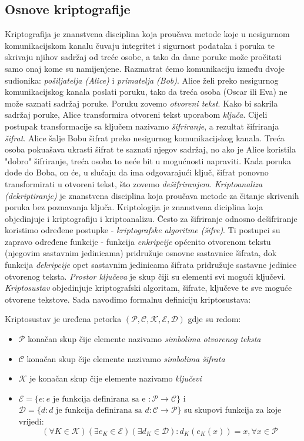 \documentclass[a4paper,oneside,12pt]{memoir} %
\begin{document}
\begin{spacing}{1.5}
\section{Osnove kriptografije}
\label{sec:kripto}
Kriptografija je znanstvena disciplina koja proučava metode koje u nesigurnom komunikacijskom kanalu  čuvaju integritet i sigurnost podataka i poruka te skrivaju njihov sadržaj od treće osobe, a tako da dane poruke može pročitati samo onaj kome su namijenjene. Razmatrat ćemo komunikaciju između dvoje sudionika: \textit{pošiljatelja (Alice)} i \textit{primatelja (Bob)}. Alice želi preko nesigurnog komunikacijskog kanala poslati poruku, tako da  treća osoba (Oscar ili Eva) ne može saznati sadržaj poruke. Poruku zovemo \textit{otvoreni tekst}. Kako bi sakrila sadržaj poruke, Alice transformira otvoreni tekst uporabom \textit{ključa}. Cijeli postupak transformacije sa ključem nazivamo \textit{šifriranje}, a rezultat šifriranja \textit{šifrat}. Alice šalje Bobu šifrat preko nesigurnog komunikacijskog kanala. Treća osoba pokuašava ukrasti šifrat te saznati njegov sadržaj, no ako je Alice koristila "dobro" šifriranje, treća osoba to neće bit u mogućnosti napraviti. Kada poruka dođe do Boba, on će, u slučaju da ima odgovarajući ključ, šifrat ponovno transformirati u otvoreni tekst, što zovemo \textit{dešifriranjem}. \textit{Kriptoanaliza (dekriptiranje)} je znanstvena disciplina koja proučava metode za čitanje skrivenih poruka bez poznavanja ključa. Kriptologija je znanstvena diciplina koja objedinjuje i kriptografiju i kriptoanalizu. Često za šifriranje odnosno dešifriranje koristimo određene postupke - \textit{kriptografske algoritme (šifre)}. Ti postupci su zapravo određene funkcije - funkcija \textit{enkripcije} općenito otvorenom tekstu (njegovim sastavnim jedinicama) pridružuje osnovne sastavnice šifrata, dok funkcija \textit{dekripcije} opet sastavnim jedinicama šifrata pridružuje sastavne jedinice otvorenog teksta. \textit{Prostor ključeva} je skup čiji su elementi svi mogući ključevi. \textit{Kriptosustav} objedinjuje kriptografski algoritam,   šifrate, ključeve te sve moguće otvorene tekstove.
Sada navodimo formalnu definiciju kriptosustava:
\begin{defn}
Kriptosustav je uređena petorka $(\mathcal{P}, \mathcal{C}, \mathcal{K}, \mathcal{E}, \mathcal{D})$ gdje su redom:
\begin{itemize}
	\item $\mathcal{P}$ konačan skup čije elemente nazivamo \textit{simbolima otvorenog teksta}
	\item $\mathcal{C}$ konačan skup čije elemente nazivamo \textit{simbolima šifrata}
	\item $\mathcal{K}$ je konačan skup čije elemente nazivamo \textit{ključevi}
	\item $\mathcal{E}=\{e :e \text{  je funkcija definirana sa e }:\mathcal{P} \to \mathcal{C} \}$ i $\mathcal{D}=\{d: d\text{ je funkcija definirana sa } d: \mathcal{C} \to \mathcal{P}\}$ su skupovi funkcija za koje vrijedi:
	\[(\forall K \in \mathcal{K})(\exists e_K \in \mathcal{E})(\exists d_K \in \mathcal{D}) : d_K(e_K(x))=x, \forall x \in \mathcal{P} \]
	

\end{itemize}
\end{defn}
\end{spacing}
\end{document}
